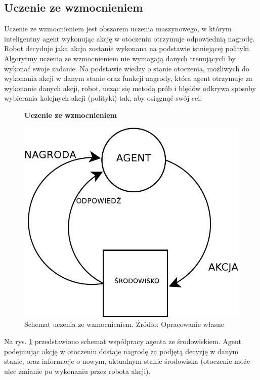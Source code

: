 \subsection{Uczenie ze wzmocnieniem}
\label{subsec:uczeniezewzmocnieniem}

Uczenie ze wzmocnieniem jest obszarem uczenia maszynowego, w którym inteligentny agent wykonując akcję w otoczeniu otrzymuje odpowiednią nagrodę.
Robot decyduje jaka akcja zostanie wykonana na podstawie istniejącej polityki. Algorytmy uczenia ze wzmocnieniem nie 
wymagają danych trenujących by wykonać swoje zadanie. Na podstawie wiedzy o stanie otoczenia, możliwych do wykonania 
akcji w danym stanie oraz funkcji nagrody, która agent otrzymuje za wykonanie danych akcji, robot, ucząc się metodą 
prób i błędów odkrywa sposoby wybierania kolejnych akcji (polityki) tak, aby osiągnąć swój cel.

\begin{figure}[h]
    \centering
    \textbf{Uczenie ze wzmocnieniem}\par\medskip
    \includegraphics[scale=0.8]{DIAGRAMreinforcementlearning}
    \caption{Schemat uczenia ze wzmocnieniem. Źródło: Opracowanie własne}
    \label{fig:DIAGRAMreinforcementlearning}
\end{figure}

Na rys. \ref{fig:DIAGRAMreinforcementlearning} przedstawiono schemat współpracy agenta ze środowiskiem. Agent 
podejmując akcję w otoczeniu dostaje nagrodę za podjętą decyzję w danym stanie, oraz informacje o nowym, aktualnym 
stanie środowiska (otoczenie może ulec zmianie po wykonaniu przez robota akcji).

